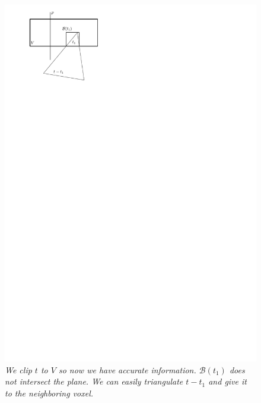 \documentclass[12pt]{article}
\begin{document}
\begin{figure}
\centering
\includegraphics{figs/splitClipping3}
\caption{\textit{We clip $t$ to $V$ so now we have accurate information. $\mathcal{B}(t_1)$ does not intersect the plane. We can easily triangulate $t-t_1$ and give it to the neighboring voxel.}}
\label{figure:sc3}
\end{figure}
\end{document}
